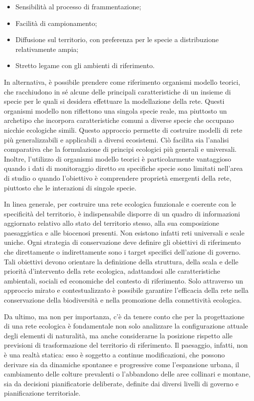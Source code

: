 \documentclass[
  a4paper,
]{book}
\begin{document}
\begin{itemize}
\item
  Sensibilità al processo di frammentazione;
\item
  Facilità di campionamento;
\item
  Diffusione sul territorio, con preferenza per le specie a
  distribuzione relativamente ampia;
\item
  Stretto legame con gli ambienti di riferimento.
\end{itemize}

In alternativa, è possibile prendere come riferimento organismi modello
teorici, che racchiudono in sé alcune delle principali caratteristiche
di un insieme di specie per le quali si desidera effettuare la
modellazione della rete. Questi organismi modello non riflettono una
singola specie reale, ma piuttosto un archetipo che incorpora
caratteristiche comuni a diverse specie che occupano nicchie ecologiche
simili. Questo approccio permette di costruire modelli di rete più
generalizzabili e applicabili a diversi ecosistemi. Ciò facilita sia
l'analisi comparativa che la formulazione di principi ecologici più
generali e universali. Inoltre, l'utilizzo di organismi modello teorici
è particolarmente vantaggioso quando i dati di monitoraggio diretto su
specifiche specie sono limitati nell'area di studio o quando l'obiettivo
è comprendere proprietà emergenti della rete, piuttosto che le
interazioni di singole specie.

In linea generale, per costruire una rete ecologica funzionale e
coerente con le specificità del territorio, è indispensabile disporre di
un quadro di informazioni aggiornato relativo allo stato del territorio
stesso, alla sua composizione paesaggistica e alle biocenosi presenti.
Non esistono infatti reti universali e scale uniche. Ogni strategia di
conservazione deve definire gli obiettivi di riferimento che
direttamente o indirettamente sono i target specifici dell'azione di
governo. Tali obiettivi devono orientare la definizione della struttura,
della scala e delle priorità d'intervento della rete ecologica,
adattandosi alle caratteristiche ambientali, sociali ed economiche del
contesto di riferimento. Solo attraverso un approccio mirato e
contestualizzato è possibile garantire l'efficacia della rete nella
conservazione della biodiversità e nella promozione della connettività
ecologica.

Da ultimo, ma non per importanza, c'è da tenere conto che per la
progettazione di una rete ecologica è fondamentale non solo analizzare
la configurazione attuale degli elementi di naturalità, ma anche
considerarne la posizione rispetto alle previsioni di trasformazione del
territorio di riferimento. Il paesaggio, infatti, non è una realtà
statica: esso è soggetto a continue modificazioni, che possono derivare
sia da dinamiche spontanee e progressive come l'espansione urbana, il
cambiamento delle colture prevalenti o l'abbandono delle aree collinari
e montane, sia da decisioni pianificatorie deliberate, definite dai
diversi livelli di governo e pianificazione territoriale.
\end{document}
